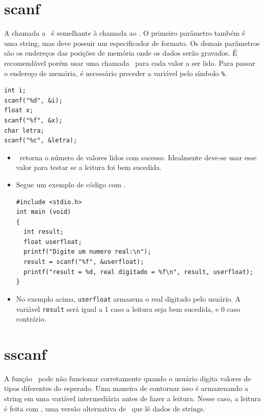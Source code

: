 \section{scanf}
\label{sec:scanf}

A chamada a \SCANF\ é semelhante à chamada ao \PRINTF. O primeiro parâmetro também é uma string, mas deve possuir um especificador de formato. Os demais parâmetros são os endereços das posições de memória onde os dados serão gravados. É recomendável porém usar uma chamada \SCANF\ para cada valor a ser lido. Para passar o endereço de memória, é necessário preceder a variável pelo símbolo {\tt \%}.

\begin{lstlisting}
int i;
scanf("%d", &i);
float x;
scanf("%f", &x);
char letra;
scanf("%c", &letra);
\end{lstlisting}

\begin{itemize}

\item \SCANF\ retorna o número de valores lidos com sucesso. Idealmente deve-se usar esse valor para testar se a leitura foi bem sucedida.

\item Segue um exemplo de código com \SCANF.

\begin{lstlisting}
#include <stdio.h> 
int main (void)
{
  int result;
  float userfloat;
  printf("Digite um numero real:\n");
  result = scanf("%f", &userfloat);
  printf("result = %d, real digitado = %f\n", result, userfloat);
}
\end{lstlisting}

\item No exemplo acima, {\tt userfloat} armazena o real digitado pelo usuário. A variável {\tt result} será igual a 1 caso a leitura seja bem sucedida, e 0 caso contrário.

\end{itemize}


\section{sscanf}
\label{sec:sscanf}

A função \SCANF\ pode não funcionar corretamente quando o usuário digita valores de tipos diferentes do esperado. Uma maneira de contornar isso é armazenando a string em uma variável intermediária antes de fazer a leitura. Nesse caso, a leitura é feita com \SSCANF, uma versão alternativa de \SCANF\ que lê dados de strings.

